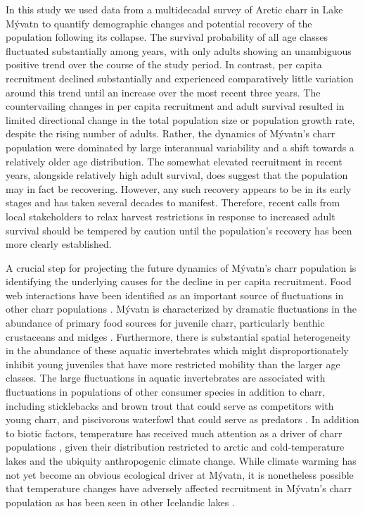 \documentclass[11pt]{article}
\begin{document}
In this study 
we used data from a multidecadal survey of Arctic charr in Lake M\'{y}vatn
to quantify demographic changes and potential recovery of the population
following its collapse.
The survival probability of all age classes fluctuated substantially among years,
with only adults showing an unambiguous positive trend over the course of the study period.
In contrast, per capita recruitment declined substantially and experienced comparatively little
variation around this trend until an increase over the most recent three years.
The countervailing changes in  per capita recruitment and adult survival resulted 
in limited directional change in the total population size or population growth rate,
despite the rising number of adults.
Rather, the dynamics of  M\'{y}vatn's charr population 
were dominated by large interannual variability
and a shift towards a relatively older age distribution.
The somewhat elevated recruitment in recent years, alongside relatively high adult survival,
does suggest that the population may in fact be recovering.
However, any such recovery appears to be in its early stages and 
has taken several decades to manifest.
Therefore, recent calls from local stakeholders to relax harvest restrictions 
in response to increased adult survival should be tempered by caution
until the population's recovery has been more clearly established.

A crucial step for projecting the future dynamics of M\'{y}vatn’s charr population 
is identifying the underlying causes for the decline in per capita recruitment.
Food web interactions have been identified as an important source 
of fluctuations in other charr populations 
\citep{snorrason1992population, amundsen1994piscivory, jonsson2015freshwater}.
M\'{y}vatn is characterized by dramatic fluctuations in the abundance 
of primary food sources for juvenile charr, particularly benthic crustaceans 
and midges 
\citep{einarsson2004clad, gardarsson2004population, gudbergsson2004}.
Furthermore, there is substantial spatial heterogeneity in the abundance 
of these aquatic invertebrates \citep{bartrons2015spatial} 
which might disproportionately inhibit young juveniles 
that have more restricted mobility than the larger age classes. 
The large fluctuations in aquatic invertebrates are associated 
with fluctuations in populations of other consumer species in addition to charr, 
including sticklebacks and brown trout that could serve 
as competitors with young charr, and piscivorous waterfowl that could serve as predators 
\citep{einarsson2004myvatn}. 
In addition to biotic factors, 
temperature has received much attention as a driver of charr populations 
\citep{winfield2008arctic, elliott2010temperature, jonsson2015freshwater},
given their distribution restricted to arctic
and cold-temperature lakes \citep{klemetsen2003atlantic}
and the ubiquity anthropogenic climate change. 
While climate warming has not yet become an obvious ecological driver at M\'{y}vatn, 
it is nonetheless possible that temperature changes have adversely affected recruitment 
in M\'{y}vatn’s charr population as has been seen in other Icelandic lakes 
\citep{malmquist2009salmonid}. 
\end{document}
